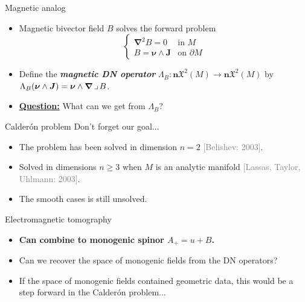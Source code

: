 \documentclass[aspectratio=169,handout]{beamer}
\newcommand\boldgreen[1]{\textcolor{lighter_csu_green}{\emph{\textbf{#1}}}}
\newcommand\boldgold[1]{\textcolor{csu_gold}{\textbf{#1}}}
\newcommand\grey[1]{\textcolor{gray}{#1}}
\newcommand{\normalpart}{\boldsymbol{n}}
\newcommand{\grad}{\boldsymbol{\nabla}}
\newcommand{\blade}[1]{\boldsymbol{#1}}
\newcommand{\normal}{\blade{\nu}}
\newcommand{\contract}{\hspace*{.5mm} \lrcorner \hspace*{.5mm}}
\newcommand{\smoothfields}{\mathfrak{X}}
\begin{document}
\begin{frame}{Magnetic analog}
\vfill
\begin{itemize}
\pause
\item Magnetic bivector field $B$ solves the forward problem
\[
\begin{cases}
\grad^2 B = 0 & \textrm{in $M$}\\
B = \normal \wedge \blade{J} & \textrm{on $\partial M$}
\end{cases}
\]
\pause
\item Define the \boldgreen{magnetic DN operator} $\Lambda_B \colon \normalpart \smoothfields^2(M) \to \normalpart \smoothfields^2(M)$ by $\Lambda_B(\normal \wedge \blade{J}) = \normal \wedge \grad \contract B$.
\pause
\item \textbf{\underline{Question:}} What can we get from $\Lambda_B$?
\end{itemize}
\vfill
\end{frame}
\begin{frame}{Calder\'on problem}
\vfill
Don't forget our goal...
\begin{itemize}
\pause
    \item The problem has been solved in dimension $n=2$ \grey{[Belishev: 2003]}.
\pause
    \item Solved in dimensions $n\geq 3$ when $M$ is an analytic manifold \grey{[Lassas, Taylor, Uhlmann: 2003]}.
\pause
\item The smooth cases is still unsolved.
\end{itemize}
\vfill
\end{frame}

\begin{frame}{Electromagnetic tomography}
\vfill
\begin{itemize}
\pause
\item \boldgold{Can combine to monogenic spinor $A_+=u+B$.}
\pause
\item Can we recover the space of monogenic fields from the DN operators?
\pause
\item If the space of monogenic fields contained geometric data, this would be a step forward in the Calder\'on problem...
\end{itemize}
\vfill
\end{frame}
\end{document}
